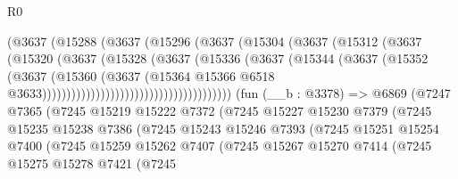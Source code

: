 \begin{lexlean}{R0}
\begin{coremodule}
                                      (@3637
                                        (@15288
                                          (@3637
                                            (@15296
                                              (@3637
                                                (@15304
                                                  (@3637
                                                    (@15312
                                                      (@3637
                                                        (@15320
                                                          (@3637
                                                            (@15328
                                                              (@3637
                                                                (@15336
                                                                  (@3637
                                                                    (@15344
                                                                      (@3637
                                                                        (@15352
                                                                          (@3637
                                                                            (@15360
                                                                              (@3637
                                                                                (@15364
                                                                                  @15366
                                                                                  @6518
                                                                                  @3633)))))))))))))))))))))))))))))))))))))))
    (fun (__b : @3378) =>
    @6869
      (@7247
        @7365
        (@7245
          @15219
          @15222
          @7372
          (@7245
            @15227
            @15230
            @7379
            (@7245
              @15235
              @15238
              @7386
              (@7245
                @15243
                @15246
                @7393
                (@7245
                  @15251
                  @15254
                  @7400
                  (@7245
                    @15259
                    @15262
                    @7407
                    (@7245
                      @15267
                      @15270
                      @7414
                      (@7245
                        @15275
                        @15278
                        @7421
                        (@7245

\end{coremodule}
\end{lexlean}
